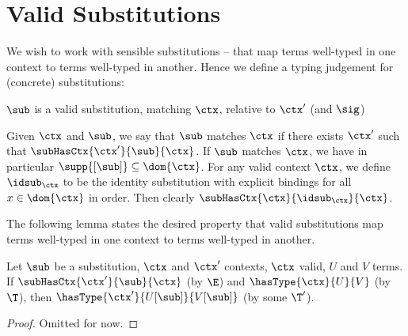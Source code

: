 \clearpage

\section*{Valid Substitutions}

We wish to work with sensible substitutions -- that map terms well-typed in one context to terms well-typed in another.
Hence we define a typing judgement for (concrete) substitutions:

\begin{judgement}{}
{$\sub$ is a valid substitution, matching $\ctx$, relative to $\ctx'$ (and $\sig$)}
%
\begin{prooftree}
\end{prooftree}

\begin{prooftree}
\end{prooftree}
%
\end{judgement}

Given $\ctx$ and $\sub$, we say that $\sub$ matches $\ctx$ if there exists $\ctx'$ such that $\subHasCtx{\ctx'}{\sub}{\ctx}$.
If $\sub$ matches $\ctx$, we have in particular $\supp{[\sub]} \subseteq \dom{\ctx}$.
For any valid context $\ctx$, we define $\idsub_{\ctx}$ to be the identity substitution with explicit bindings for all $x \in \dom{\ctx}$ in order.
Then clearly $\subHasCtx{\ctx}{\idsub_{\ctx}}{\ctx}$.


The following lemma states the desired property that valid substitutions map terms well-typed in one context to terms well-typed in another.

\begin{lemma}
\label{lem:substitutions-preserve-validity}
Let $\sub$ be a substitution, $\ctx$ and $\ctx'$ contexts, $\ctx$ valid, $U$ and $V$ terms.
If $\subHasCtx{\ctx'}{\sub}{\ctx}$ (by $\E$) and $\hasType{\ctx}{U}{V}$ (by $\T$), then $\hasType{\ctx'}{U[\sub]}{V[\sub]}$ (by some $\T'$).
\end{lemma}

\begin{proof}
Omitted for now.
\end{proof}

